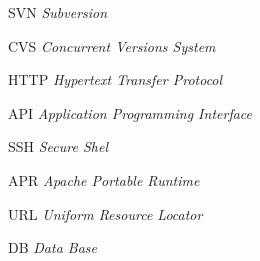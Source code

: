 \begin{siglas}
  \item[SVN] \textit{Subversion}
  \item[CVS] \textit{Concurrent Versions System}
  \item[HTTP] \textit{Hypertext Transfer Protocol}
  \item[API] \textit{Application Programming Interface}
  \item[SSH] \textit{Secure Shel}
  \item[APR] \textit{Apache Portable Runtime}
  \item[URL] \textit{Uniform Resource Locator}
  \item[DB] \textit{Data Base}


\end{siglas}

